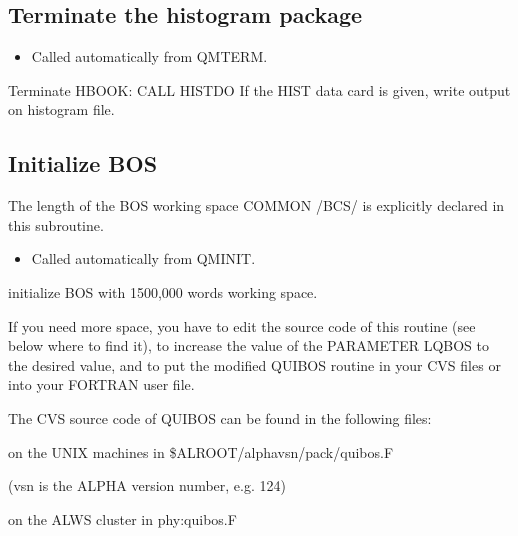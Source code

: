 \subsection{\label{sec-QUTH}Terminate the histogram package}
\par
{}
\par
\begin{itemize}
\item Called automatically from QMTERM.
\end{itemize}
\begin{indentlist}{ 3.00cm}{ 3.25cm}
Terminate HBOOK: CALL HISTDO
If the HIST data card is given, write output on histogram file.
\end{indentlist}
\subsection{\label{sec-QUIB}Initialize BOS}
\par
{}
\par The length of the
BOS working space COMMON /BCS/ is explicitly declared in this
subroutine.
\begin{itemize}
\item Called automatically from QMINIT.
\end{itemize}
\begin{indentlist}{ 3.00cm}{ 3.25cm}
initialize BOS with 1500,000 words working space.
\end{indentlist}

If you need more space, you have to edit the source code of this routine (see below where to find it),
 to increase the value of the PARAMETER LQBOS to the desired value, and to put
  the modified QUIBOS routine in your CVS files or into your FORTRAN user file.

The CVS source code of QUIBOS can be found in the following files:

on the UNIX machines in  \$ALROOT/alphavsn/pack/quibos.F

                        (vsn is the ALPHA version number, e.g.  124)

on the ALWS cluster  in  phy:quibos.F

